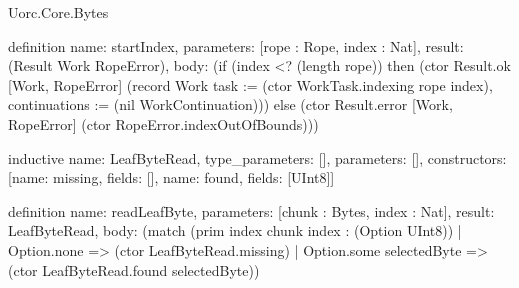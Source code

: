 \begin{lexlean}{Uorc.Core.Bytes}
\begin{semanticmodule}
definition{
  name: startIndex,
  parameters: [rope : Rope, index : Nat],
  result: (Result Work RopeError),
  body: (if (index <? (length rope)) then (ctor Result.ok [Work, RopeError] (record Work {task := (ctor WorkTask.indexing rope index), continuations := (nil WorkContinuation)})) else (ctor Result.error [Work, RopeError] (ctor RopeError.indexOutOfBounds)))
}

inductive{
  name: LeafByteRead,
  type_parameters: [],
  parameters: [],
  constructors: [{name: missing, fields: []}, {name: found, fields: [UInt8]}]
}

definition{
  name: readLeafByte,
  parameters: [chunk : Bytes, index : Nat],
  result: LeafByteRead,
  body: (match (prim index chunk index : (Option UInt8))
    | Option.none => (ctor LeafByteRead.missing)
    | Option.some selectedByte => (ctor LeafByteRead.found selectedByte))
}


\end{semanticmodule}
\end{lexlean}
